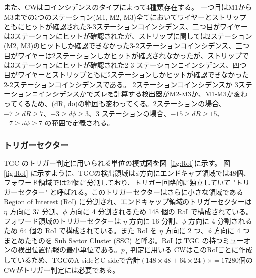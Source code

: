 また、CWはコインシデンスのタイプによって4種類存在する。
一つ目はM1からM3までの3つのステーション(M1, M2, M3)全てにおいてワイヤーとストリップともにヒットが確認された3-3ステーションコインシデンス、二つ目がワイヤーは3ステーションにヒットが確認されたが、ストリップに関しては2ステーション(M2, M3)のヒットしか確認できなかった3-2ステーションコインシデンス、三つ目がワイヤーは2ステーションしかヒットが確認されなかったが、ストリップでは3ステーションにヒットが確認された2-3 ステーションコインシデンス、四つ目がワイヤーとストリップともに2ステーションしかヒットが確認できなかった2-2ステーションコインシデンスである。
2ステーションコインシデンスか 3ステーションコインシデンスかでズレを計算する検出器がM2-M3か、M1-M3か変わってくるため、(dR, dφ)の範囲も変わってくる。2ステーションの場合、$−7 \geq dR \geq 7$、$−3 \geq d\phi \geq 3$、3 ステーションの場合、$−15 \geq dR \geq 15$、$−7 \geq d\phi \geq 7$ の範囲で定義される。


\subsubsection{トリガーセクター}
TGC のトリガー判定に用いられる単位の模式図を図~\ref{fig:RoI}に示す。
図\ref{fig:RoI} に示すように、TGCの検出領域は$\phi$方向にエンドキャプ領域では48個、フォワード領域では24個に分割しており、トリガー回路的に独立していて "トリガーセクター" と呼ばれる。このトリガーセクターはさらに小さな領域である Region of Interest (RoI) に分割され、エンドキャップ領域のトリガーセクターは $\eta$ 方向に 37 分割、$\phi$ 方向に 4 分割されるため 148 個の RoI で構成されている。フォワード領域のトリガーセクターは $\eta$ 方向に 16 分割、$\phi$ 方向に 4 分割されるため 64 個の RoI で構成されている。また RoI を $\eta$ 方向に 2 つ、$\phi$ 方向に 4 つまとめたものを Sub Sector Cluster (SSC) と呼ぶ。RoI は TGC の持つミューオンの検出位置情報の最小単位である。$p_T$ 判定に用いる CWはこのRoIごとに作成しているため、TGCのA-sideとC-sideで合計$(148\times48+64\times24)\times=17280$個のCWがトリガー判定には必要である。

